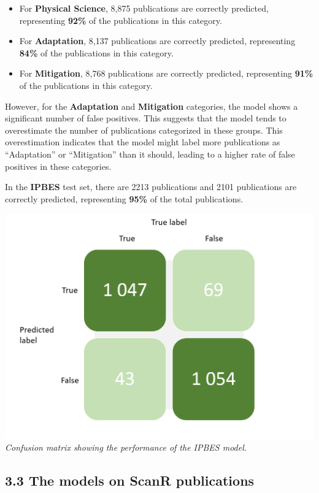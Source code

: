 \documentclass[
]{article}
\providecommand{\tightlist}{%
  \setlength{\itemsep}{0pt}\setlength{\parskip}{0pt}}
\begin{document}
\begin{itemize}
\tightlist
\item
  For \textbf{Physical Science}, 8,875 publications are correctly
  predicted, representing \textbf{92\%} of the publications in this
  category.
\item
  For \textbf{Adaptation}, 8,137 publications are correctly predicted,
  representing \textbf{84\%} of the publications in this category.
\item
  For \textbf{Mitigation}, 8,768 publications are correctly predicted,
  representing \textbf{91\%} of the publications in this category.
\end{itemize}

However, for the \textbf{Adaptation} and \textbf{Mitigation} categories,
the model shows a significant number of false positives. This suggests
that the model tends to overestimate the number of publications
categorized in these groups. This overestimation indicates that the
model might label more publications as ``Adaptation'' or ``Mitigation''
than it should, leading to a higher rate of false positives in these
categories.

In the \textbf{IPBES} test set, there are 2213 publications and 2101
publications are correctly predicted, representing \textbf{95\%} of the
total publications.

\includegraphics{./images/teds_ipbes_model.png} \emph{Confusion matrix
showing the performance of the IPBES model.}

\hypertarget{the-models-on-scanr-publications}{%
\subsection{3.3 The models on ScanR
publications}\label{the-models-on-scanr-publications}}
\end{document}
